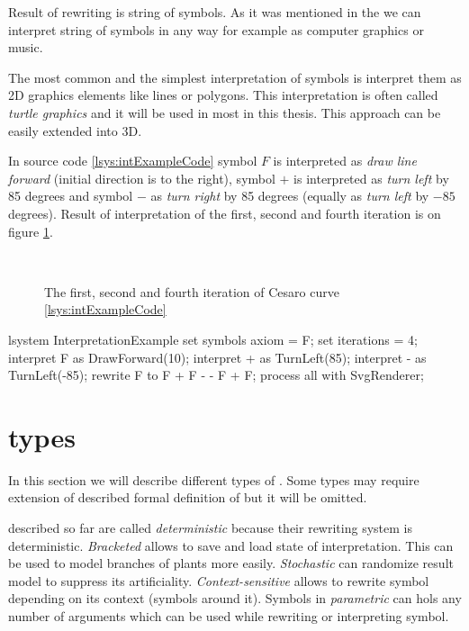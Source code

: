 Result of \lsystem rewriting is string of symbols.
As it was mentioned in the  we can interpret string of symbols in any way for example as computer graphics or music.

The most common and the simplest interpretation of \lsystem symbols is interpret them as 2D graphics elements like lines or polygons.
This interpretation is often called \emph{turtle graphics} and it will be used in most \lsystems in this thesis.
This approach can be easily extended into 3D.

In source code \ref{lsys:intExampleCode} symbol $F$ is interpreted as \emph{draw line forward} (initial direction is to the right), symbol $+$ is interpreted as \emph{turn left} by 85 degrees and symbol $-$ as \emph{turn right} by 85 degrees (equally as \emph{turn left} by $-85$ degrees).
Result of interpretation of the first, second and fourth iteration is on figure \ref{fig:intExample}.

\begin{figure}[ht]
	\centering
	 ~
	 ~
	\caption{The first, second and fourth iteration of Cesaro curve \lsystem \ref{lsys:intExampleCode}}
	\label{fig:intExample}
\end{figure}

\begin{Lsystem}[label=lsys:intExampleCode,caption={Symbol interpretation example}]
lsystem InterpretationExample {
	set symbols axiom = F;
	set iterations = 4;
	interpret F as DrawForward(10);
	interpret + as TurnLeft(85);
	interpret - as TurnLeft(-85);
	rewrite F to F + F - - F + F;
}
process all with SvgRenderer;
\end{Lsystem}


\section{\lsystem types}

In this section we will describe different types of \lsystems.
Some types may require extension of described formal definition of \lsystem but it will be omitted.

\lsystems described so far are called \emph{deterministic \lsystems} because their rewriting system is deterministic.
\emph{Bracketed \lsystems} allows to save and load state of interpretation.
This can be used to model branches of plants more easily.
\emph{Stochastic \lsystems} can randomize result model to suppress its artificiality.
\emph{Context-sensitive \lsystems} allows to rewrite symbol depending on its context (symbols around it).
Symbols in \emph{parametric \lsystems} can hols any number of arguments which can be used while rewriting or interpreting symbol.

